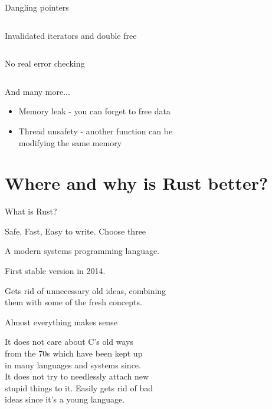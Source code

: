 \documentclass[usenames,dvipsnames,10pt,aspectratio=169]{beamer}
\begin{document}
\begin{frame}{Dangling pointers} 
	\inputminted[fontsize=\large]{c}{code/danp.c}
\end{frame}

\begin{frame}{Invalidated iterators and double free} 
	\inputminted[fontsize=\large]{c}{code/iter.c}
\end{frame}

\begin{frame}{No real error checking} 
	\inputminted[fontsize=\large]{c}{code/errorcheck.c}
\end{frame}

\begin{frame}{And many more...}
	\Large
	\begin{itemize}[label=$\bullet$]
		\item Memory leak - you can forget to free data
		\item Thread unsafety - another function can be \\
			modifying the same memory
	\end{itemize}
\end{frame}



\section{Where and why is Rust better?}

\begin{frame}{What is Rust?}

\LARGE{\textcolor{ucuyellow}{Safe, Fast, Easy to write. Choose three}}

\vspace{0.8cm}
\large
A modern systems programming language.

\vspace{0.3cm}

First stable version in 2014.\\

\vspace{0.3cm}

Gets rid of unnecessary old ideas, combining \\
them with some of the fresh concepts.
\end{frame}

\begin{frame}{Almost everything makes sense} 

\large
It does not care about C’s old ways\\ 
from the 70s which have been kept up \\
in many languages and systems since.\\ 

\vspace{0.3cm}
It does not try to needlessly attach new\\ 
stupid things to it. Easily gets rid of bad\\ 
ideas since it’s a young language.\\
\end{frame}
\end{document}
